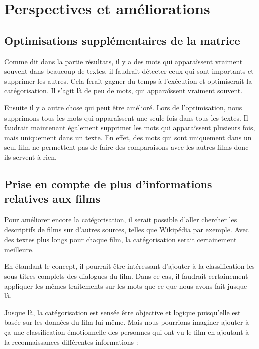 \chapter{Perspectives et améliorations}
\section{Optimisations supplémentaires de la matrice}

Comme dit dans la partie résultats, il y a des mots qui apparaîssent vraiment souvent dans beaucoup de textes, il faudrait détecter ceux qui sont importants et supprimer les autres. Cela ferait gagner du temps à l'exécution et optimiserait la catégorisation. Il s'agit là de peu de mots, qui apparaîssent vraiment souvent.

Ensuite il y a autre chose qui peut être amélioré. Lors de l'optimisation, nous supprimons tous les mots qui apparaîssent une seule fois dans tous les textes. Il faudrait maintenant également supprimer les mots qui apparaîssent plusieurs fois, mais uniquement dans un texte. En effet, des mots qui sont uniquement dans un seul film ne permettent pas de faire des comparaisons avec les autres films donc ils servent à rien.

\section{Prise en compte de plus d'informations relatives aux films}
\label{plus-informations}
Pour améliorer encore la catégorisation, il serait possible d'aller chercher les descriptifs de films sur d'autres sources, telles que Wikipédia par exemple. Avec des textes plus longs pour chaque film, la catégorisation serait certainement meilleure.

En étandant le concept, il pourrait être intéressant d'ajouter à la classification les sous-titres complets des dialogues du film. Dans ce cas, il faudrait certainement appliquer les mêmes traitements sur les mots que ce que nous avons fait jusque là.

Jusque là, la catégorisation est sensée être objective et logique puisqu'elle est basée sur les données du film lui-même. Mais nous pourrions imaginer ajouter à ça une classification émotionnelle des personnes qui ont vu le film en ajoutant à la reconnaissances différentes informations : \\

